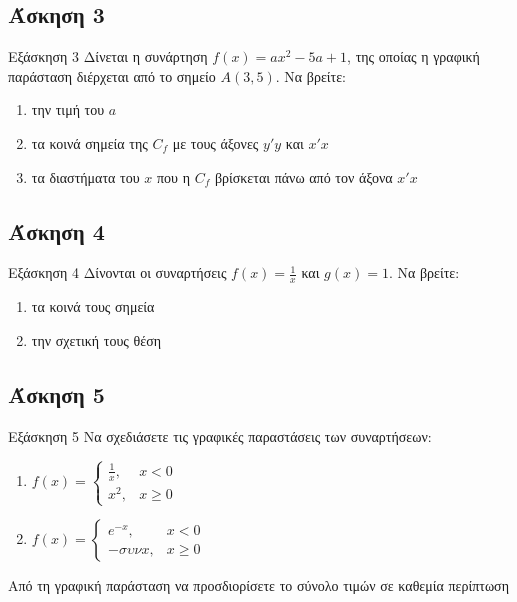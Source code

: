 \documentclass[greek]{beamer}
\begin{document}
\subsection{Άσκηση 3}
\begin{frame}[label=Άσκηση3,t]{Εξάσκηση 3}
      Δίνεται η συνάρτηση $f(x)=ax^2-5a+1$, της οποίας η γραφική παράσταση διέρχεται από το σημείο $Α(3,5)$. Να βρείτε:
      \begin{enumerate}
            \item<1-> την τιμή του $a$
            \item<2-> τα κοινά σημεία της $C_f$ με τους άξονες $y'y$ και $x'x$
            \item<3-> τα διαστήματα του $x$ που η $C_f$ βρίσκεται πάνω από τον άξονα $x'x$
      \end{enumerate}
\end{frame}

\subsection{Άσκηση 4}
\begin{frame}[label=Άσκηση4,t]{Εξάσκηση 4}
      Δίνονται οι συναρτήσεις $f(x)=\frac{1}{x}$ και $g(x)=1$. Να βρείτε:
      \begin{enumerate}
            \item<1-> τα κοινά τους σημεία
            \item<2-> την σχετική τους θέση
      \end{enumerate}
\end{frame}

\subsection{Άσκηση 5}
\begin{frame}[label=Άσκηση5,t]{Εξάσκηση 5}
      Να σχεδιάσετε τις γραφικές παραστάσεις των συναρτήσεων:
      \begin{enumerate}
            \item<1->
                  $f(x)=
                        \begin{cases}
                              \frac{1}{x}, & x<0    \\
                              x^2,         & x\ge 0
                        \end{cases}$

            \item<2-> $f(x)=
                        \begin{cases}
                              e^{-x}, & x<0    \\
                              -συν x, & x\ge 0
                        \end{cases}$
      \end{enumerate}
      Από τη γραφική παράσταση να προσδιορίσετε το σύνολο τιμών σε καθεμία περίπτωση
\end{frame}
\end{document}
